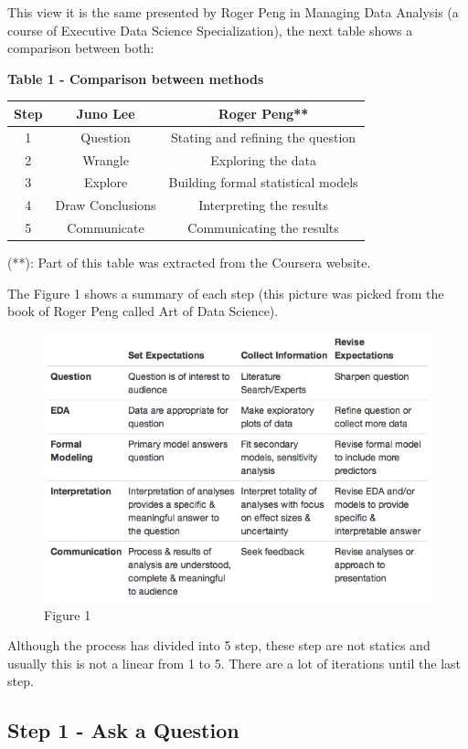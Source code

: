 \documentclass[]{book}
\begin{document}
This view it is the same presented by Roger Peng in Managing Data
Analysis (a course of Executive Data Science Specialization), the next
table shows a comparison between both:

\textbf{Table 1 - Comparison between methods}

\begin{longtable}[]{@{}ccc@{}}
\toprule
Step & Juno Lee & Roger Peng**\tabularnewline
\midrule
\endhead
1 & Question & Stating and refining the question\tabularnewline
2 & Wrangle & Exploring the data\tabularnewline
3 & Explore & Building formal statistical models\tabularnewline
4 & Draw Conclusions & Interpreting the results\tabularnewline
5 & Communicate & Communicating the results\tabularnewline
\bottomrule
\end{longtable}

(**): Part of this table was extracted from the Coursera website.

The Figure 1 shows a summary of each step (this picture was picked from
the book of Roger Peng called Art of Data Science).

\begin{figure}
\centering
\includegraphics{03-img/1.png}
\caption{Figure 1}
\end{figure}

Although the process has divided into 5 step, these step are not statics
and usually this is not a linear from 1 to 5. There are a lot of
iterations until the last step.

\subsection{Step 1 - Ask a Question}\label{step-1---ask-a-question}
\end{document}
